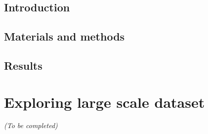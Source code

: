 
\subsection{Introduction}
\label{subsec:introduction_protrusion}

\subsection{Materials and methods}
\label{subsec:materials_protrusion}

\subsection{Results}
\label{subsec:results_protrusion}

\section{Exploring large scale dataset}
\label{sec:exploration}

\begin{center}
	\textit{(To be completed)}
\end{center}



